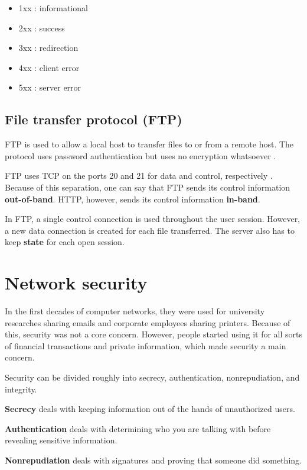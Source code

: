 \begin{itemize}
 \item 1xx : informational
 \item 2xx : success
 \item 3xx : redirection
 \item 4xx : client error
 \item 5xx : server error
\end{itemize}

\subsection{File transfer protocol (FTP)}

FTP is used to allow a local host to transfer files to or from a remote host. The protocol uses password authentication but uses no encryption whatsoever \cite[p.~116]{computer-networking-kurose-2012}.

FTP uses TCP on the ports 20 and 21 for data and control, respectively \cite[p.~117]{computer-networking-kurose-2012}. Because of this separation, one can say that FTP sends its control information \textbf{out-of-band}. HTTP, however, sends its control information \textbf{in-band}.

In FTP, a single control connection is used throughout the user session. However, a new data connection is created for each file transferred. The server also has to keep \textbf{state} for each open session.

\section{Network security}

In the first decades of computer networks, they were used for university researches sharing emails and corporate employees sharing printers. Because of this, security was not a core concern. However, people started using it for all sorts of financial transactions and private information, which made security a main concern.

Security can be divided roughly into secrecy, authentication, nonrepudiation, and integrity.

\textbf{Secrecy} deals with keeping information out of the hands of unauthorized users.

\textbf{Authentication} deals with determining who you are talking with before revealing sensitive information.

\textbf{Nonrepudiation} deals with signatures and proving that someone did something.

